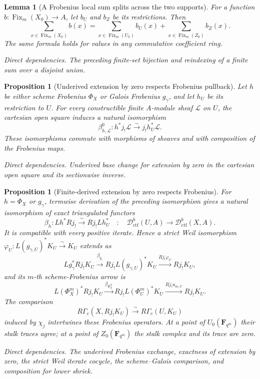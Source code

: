 \documentclass[10pt]{article}
\newtheorem{proposition}[theorem]{Proposition}
\newtheorem{lemma}[theorem]{Lemma}
\theoremstyle{definition}
\newcommand{\Dctf}{\mathcal D^b_{\mathrm{ctf}}}
\newcommand{\Fix}{\operatorname{Fix}}
\newcommand{\RGammac}{R\Gamma_c}
\newcommand{\depends}[1]{\par\smallskip\noindent\textit{Direct dependencies.} #1\par}
\begin{document}
\begin{lemma}[A Frobenius local sum splits across the two supports]
For a function \(b:\Fix_m(X_0)\to A\), let \(b_U\) and \(b_Z\) be its
restrictions.  Then
\[
 \sum_{x\in\Fix_m(X_0)}b(x)=
 \sum_{x\in\Fix_m(U_0)}b_U(x)+
 \sum_{x\in\Fix_m(Z_0)}b_Z(x).
\]
The same formula holds for values in any commutative coefficient ring.
\depends{The preceding finite-set bijection and reindexing of a finite sum
over a disjoint union.}
\end{lemma}

\begin{proposition}[Underived extension by zero respects Frobenius pullback]
Let \(h\) be either scheme Frobenius \(\Phi_X\) or Galois Frobenius
\(g_\gamma\), and let \(h_U\) be its restriction to \(U\).  For every
constructible finite \(A\)-module sheaf \(\mathcal L\) on \(U\), the
cartesian open square induces a natural isomorphism
\[
 \beta^{0}_{h,\mathcal L}:h^*j_!\mathcal L
 \xrightarrow{\sim}j_!h_U^*\mathcal L.
\]
These isomorphisms commute with morphisms of sheaves and with composition
of the Frobenius maps.
\depends{Underived base change for extension by zero in the cartesian open
square and its sectionwise inverse.}
\end{proposition}

\begin{proposition}[Finite-derived extension by zero respects Frobenius]
For \(h=\Phi_X\) or \(g_\gamma\), termwise derivation of the preceding
isomorphism gives a natural isomorphism of exact triangulated functors
\[
 \beta_{h}:Lh^*Rj_!\xrightarrow{\sim}Rj_!Lh_U^*
 \quad:\quad\Dctf(U,A)\longrightarrow\Dctf(X,A).
\]
It is compatible with every positive iterate.  Hence a strict Weil
isomorphism
\(\varphi_U:L(g_{\gamma,U})^*K_U\xrightarrow{\sim}K_U\) extends as
\[
 Lg_\gamma^*Rj_!K_U
 \xrightarrow{\beta_{g_\gamma}}Rj_!L(g_{\gamma,U})^*K_U
 \xrightarrow{Rj_!\varphi_U}Rj_!K_U,
\]
and its \(m\)-th scheme-Frobenius arrow is
\[
 L(\Phi_X^m)^*Rj_!K_U
 \xrightarrow{\beta_{\Phi_X^m}}Rj_!L(\Phi_U^m)^*K_U
 \xrightarrow{Rj_!u_{m,U}}Rj_!K_U.
\]
The comparison
\[
 \RGammac(X,Rj_!K_U)\xrightarrow{\sim}\RGammac(U,K_U)
\]
induced by \(\chi_j\) intertwines these Frobenius operators.  At a point
of \(U_0(\mathbf F_{q^m})\) their stalk traces agree; at a point of
\(Z_0(\mathbf F_{q^m})\) the stalk complex and its trace are zero.
\depends{The underived Frobenius exchange, exactness of extension by zero,
the strict Weil iterate cocycle, the scheme--Galois comparison, and
composition for lower shriek.}
\end{proposition}
\end{document}
